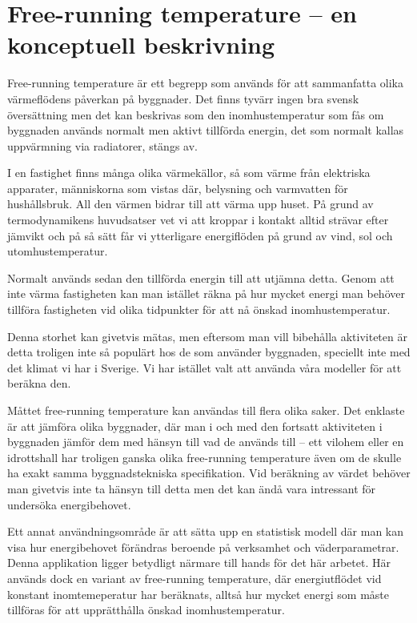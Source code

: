 \section{Free-running temperature – en konceptuell beskrivning}
\label{sec:freerunningtemp}

Free-running temperature är ett begrepp som används för att sammanfatta olika 
värmeflödens påverkan på byggnader. Det finns tyvärr ingen bra svensk översättning 
men det kan beskrivas som den inomhustemperatur som fås om byggnaden används 
normalt men aktivt tillförda energin, det som normalt kallas uppvärmning via radiatorer, 
stängs av.

I en fastighet finns många olika värmekällor, så som värme från elektriska apparater, 
människorna som vistas där, belysning och varmvatten för hushållsbruk. All den värmen
 bidrar till att värma upp huset. På grund av termodynamikens huvudsatser vet vi att 
 kroppar i kontakt alltid strävar efter jämvikt och på så sätt får vi ytterligare energiflöden på 
 grund av vind, sol och utomhustemperatur.

Normalt används sedan den tillförda energin till att utjämna detta. Genom att inte värma 
fastigheten kan man istället räkna på hur mycket energi man behöver tillföra fastigheten 
vid olika tidpunkter för att nå önskad inomhustemperatur.

Denna storhet kan givetvis mätas, men eftersom man vill bibehålla aktiviteten är detta troligen inte så populärt hos de som använder byggnaden, speciellt inte med det klimat vi har i Sverige. Vi har istället valt att använda våra modeller för att beräkna den.

Måttet free-running temperature kan användas till flera olika saker. Det enklaste är att 
jämföra olika byggnader, där man i och med den fortsatt aktiviteten i byggnaden jämför
 dem med hänsyn till vad de används till – ett vilohem eller en idrottshall har troligen 
 ganska olika free-running temperature även om de skulle ha exakt samma 
 byggnadstekniska specifikation. Vid beräkning av värdet behöver man givetvis inte ta 
 hänsyn till detta men det kan ändå vara intressant för undersöka energibehovet.

Ett annat användningsområde är att sätta upp en statistisk modell där man kan visa hur 
energibehovet förändras beroende på verksamhet och väderparametrar. Denna applikation ligger betydligt närmare till hands för det här arbetet. Här används dock en variant av free-running temperature, där energiutflödet vid konstant inomtemeperatur har beräknats, alltså hur mycket energi som måste tillföras för att upprätthålla önskad inomhustemperatur.
